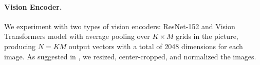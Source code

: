 \paragraph{Vision Encoder.}
\label{vision-encoder}
We experiment with two types of vision encoders: ResNet-152 \cite{he2015deep} and Vision Transformers \cite{dosovitskiy2021image} model with average pooling over \begin{math} K \times M \end{math} grids in the picture, producing \begin{math} N = KM \end{math} output vectors with a total of 2048 dimensions for each image. As suggested in \cite{kiela2020supervised}, we resized, center-cropped, and normalized the images.








